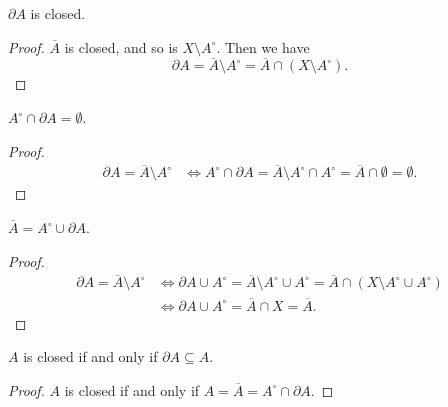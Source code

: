 \begin{proposition}
	$\partial A$ is closed.
	
	\begin{proof}
		$\overline A$ is closed, and so is $X \setminus A^\circ$. Then we have
		$$
		\partial A = \overline A \setminus A^\circ = \overline A \cap (X \setminus A^\circ).
		$$
	\end{proof}
\end{proposition}


\begin{proposition}
	$A^\circ \cap \partial A = \emptyset$.
	
	\begin{proof}
		$$
		\begin{aligned}
			\partial A = \overline A \setminus A^\circ &\iff A^\circ \cap \partial A = \overline A \setminus A^\circ \cap A^\circ = \overline A \cap \emptyset = \emptyset.
		\end{aligned}
		$$
	\end{proof}
\end{proposition}


\begin{proposition}
	$\overline A = A^\circ \cup \partial A$.
	
	\begin{proof}
		$$
		\begin{aligned}
			\partial A = \overline A \setminus A^\circ &\iff \partial A \cup A^\circ = \overline A \setminus A^\circ \cup A^\circ = \overline A \cap (X \setminus A^\circ \cup A^\circ) \\
			&\iff \partial A \cup A^\circ = \overline A \cap X = \overline A.
		\end{aligned}
		$$
	\end{proof}
\end{proposition}


\begin{proposition}
	$A$ is closed if and only if $\partial A \subseteq A$.
	
	\begin{proof}
		$A$ is closed if and only if $A = \overline A = A^\circ \cap \partial A$.
	\end{proof}
\end{proposition}


